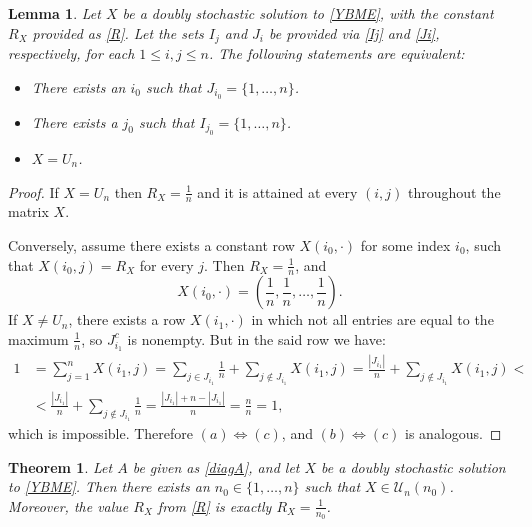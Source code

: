\documentclass{article}
\newtheorem{theorem}{Theorem}[section]
\newtheorem{lemma}{Lemma}[section]
\theoremstyle{definition}\newtheorem{example}{Example}[section]
\def\U{{\mathcal{U}}}
\begin{document}
	\begin{lemma}\label{emptycomplements} Let $X$ be a doubly stochastic solution to \eqref{YBME}, with the constant $R_X$ provided as \eqref{R}. Let the sets $I_j$ and $J_i$ be provided via \eqref{Ij} and \eqref{Ji}, respectively, for each $1\leq i,j\leq n$. The following statements are equivalent:
		\begin{itemize}
			\item[(a)] There exists an $i_0$ such that $J_{i_0}=\{1,\ldots,n\}$.
			\item[(b)] There exists a $j_0$ such that $I_{j_0}=\{1,\ldots,n\}$.
			\item[(c)] $X=U_n$.
		\end{itemize}
	\end{lemma}
	\begin{proof}
		If $X=U_n$ then $R_X=\frac{1}{n}$ and it is attained at every $(i,j)$ throughout the matrix $X$.
		
		Conversely, assume there exists a constant row $X(i_0,\cdot)$ for some index $i_0$, such that $X(i_0,j)=R_X$ for every $j$. Then $R_X=\frac{1}{n}$, and  $$X(i_0,\cdot)=\left(\frac{1}{n},\frac{1}{n},\ldots,\frac{1}{n}\right).$$
		If $X\neq U_n$, there exists a row $X(i_1,\cdot)$ in which not all entries are equal to the maximum $\frac{1}{n}$, so $J_{i_1}^c$ is nonempty. But in the said row we have:
		$$\begin{aligned}
			1&=\sum_{j=1}^n X(i_1,j)=\sum_{j\in J_{i_1}}\frac{1}{n}+\sum_{j\notin J_{i_1}}X(i_1,j)=\frac{|J_{i_1}|}{n}+\sum_{j\notin J_{i_1}}X(i_1,j)<\\
			&<\frac{|J_{i_1}|}{n}+\sum_{j\notin J_{i_1}}\frac{1}{n}=\frac{|J_{i_1}|+n-|J_{i_1}|}{n}=\frac{n}{n}=1,
		\end{aligned}$$
		which is impossible. Therefore $(a)\Leftrightarrow(c)$, and $(b)\Leftrightarrow(c)$ is analogous.
	\end{proof}
	\begin{theorem}\label{udmus}
		Let $A$ be given as \eqref{diagA}, and let $X$ be a doubly stochastic solution to \eqref{YBME}. Then there exists an $n_0\in\{1,\ldots,n\}$ such that $X\in\U_n(n_0)$. Moreover, the value $R_X$ from \eqref{R} is exactly $R_X=\frac{1}{n_0}$.
	\end{theorem}
	
\end{document}
